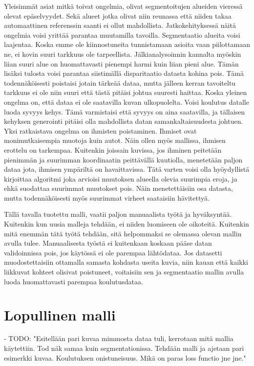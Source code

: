 Yleisimmät asiat mitkä toivat ongelmia, olivat segmentoitujen alueiden vieressä olevat epäselvyydet.
Sekä alueet jotka olivat niin reunassa että niiden takaa automaattinen referenssin saanti ei ollut mahdollista.
Jatkokehityksessä näitä ongelmia voisi yrittää parantaa muutamilla tavoilla. 
Segmentaatio alueita voisi laajentaa.
Koska emme ole kiinnostuneita tunnistamaan asioita vaan piilottamaan ne, ei kovin suuri tarkkuus ole tarpeellista.
Jälkianalysoinnin kannalta myöskin liian suuri alue on huomattavasti pienempi harmi kuin liian pieni alue. 
Tämän lisäksi tulosta voisi parantaa siistimällä disparitaatio datasta kohina pois.
Tämä todennäköisesti poistaisi jotain tärkeää dataa, mutta jälleen kerran tavoiteltu tarkkuus ei ole niin suuri että tästä pitäisi johtua suuresti haittaa.
Koska yleinen ongelma on, että dataa ei ole saatavilla kuvan ulkopuolelta. Voisi koulutus datalle luoda syvyys kehys.
Tämä varmistaisi että syvyys on aina saatavilla, ja tällaisen kehyksen generointi pitäisi olla mahdollista datan samankaltaisuudesta johtuen.
Yksi ratkaistava ongelma on ihmisten poistaminen.
Ihmiset ovat monimutkaisempia muotoja kuin autot.
Näin ollen myös mallissa, ihmisen erottelu on tarkempaa.
Kuitenkin joissain kuvissa,
jos ihminen peitetään pienimmän ja suurimman koordinaatin peittävällä kuutiolla,
menetetään paljon dataa jota, ihmisen ympäriltä on havaittavissa.
Tätä varten voisi olla hyöydyllistä kirjoittaa algoritmi joka arvioisi muutoksen alueella olevia suurimpia eroja,
ja ehkä suodattaa suurimmat muutokset pois. Näin menetettäisiin osa datasta,
mutta todennäköisesti myös suurimmat virheet saataisiin hävitettyä. 

Tällä tavalla tuotettu malli, vaatii paljon manuaalista työtä ja hyväksyntää.
Kuitenkin kun uusia malleja tehdään, ei niiden luomiseen ole oikoteitä.
Kuitenkin mitä enemmän tätä työtä tehdään,
sitä helpommaksi se olemassa olevan mallin avulla tulee.
Manuaalisesta työstä ei kuitenkaan koskaan pääse datan validoinnissa pois,
jos käytössä ei ole parempaa lähtödataa.
Jos datasetti muodostettaisiin ottamalla samasta kohdasta useita kuvia,
niin kauan että kaikki liikkuvat kohteet olisivat poistuneet,
voitaisiin sen ja segmentaatio mallin avulla luoda huomattavasti parempaa koulutusdataa. 

\section{Lopullinen malli}

- TODO: "Esitellään pari kuvaa mimmosta dataa tuli, kerrotaan mitä mallia käytettiin. Tod näk samaa kuin segmentationissa. Tehdään malli ja ajetaan pari esimerkki kuvaa. Koulutuksen onistuneisuus. Mikä on paras loss functio jne jne."
 

